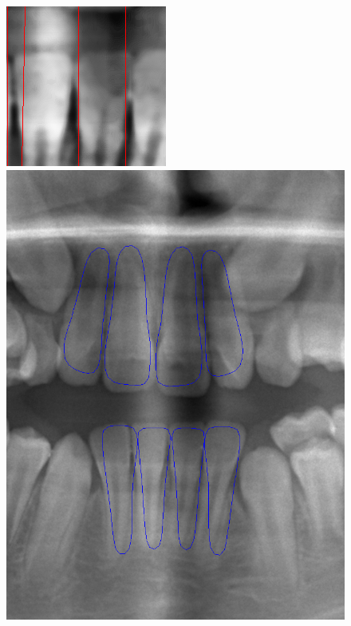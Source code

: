 \documentclass[a4paper,titlepage,12pt]{article}
\begin{document}
\begin{figure}
\begin{minipage}[b]{0.32\linewidth}
	\end{minipage}
	\begin{minipage}[b]{0.32\linewidth}
		\includegraphics[width=\linewidth]{init/down.png}
	\end{minipage}
	\begin{minipage}[b]{0.32\linewidth}
		\includegraphics[width=\linewidth]{init/initial.png}

\end{minipage}
\end{figure}
\end{document}
